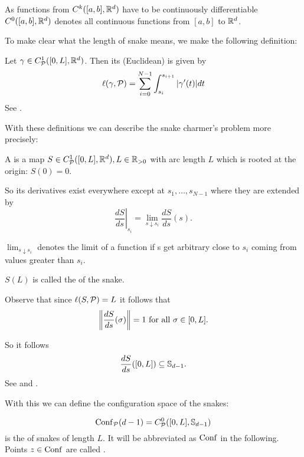 \begin{remark}
    As functions from $C^{k}({[a,b]}, \mathbb{R}^d)$ have to be continuously differentiable
    $C^{0}({[a,b]}, \mathbb{R}^d)$ denotes all continuous functions from $[a,b]$ to $\mathbb{R}^d$.
\end{remark}

To make clear what the length of snake means, we make the following definition:
\begin{definition}
    Let $\gamma \in C^{1}_{\mathcal{P}}({[0,L]}, {\mathbb{R}^d})$. Then its (Euclidean) 
    is given by
    \[
        \ell({\gamma}, \mathcal{P})
        = \sum_{i=0}^{N-1}\int_{s_i}^{s_{i+1}} |\gamma'(t)| dt
    \]
    See \cite[p. 31]{Ratcliff}.
\end{definition}

With these definitions we can describe the snake charmer's problem more precisely:
\begin{definition}
    A  is a map $S \in C^{1}_{\mathcal{P}}({[0,L]}, {\mathbb{R}^d}), L \in \mathbb{R}_{>0}$
    with arc length $L$ which is rooted at the origin: $S(0) = 0$.
    
    So its derivatives exist everywhere except at $s_1, \ldots, s_{N-1}$ where
    they are extended by
    \[
        \left.\frac{dS}{ds}\right|_{s_i} = \lim_{s \downarrow s_i}\frac{dS}{ds}(s).
    \]
    
    $\lim_{s \downarrow s_i}$ denotes the limit of a function if s get arbitrary
    close to $s_i$ coming from values greater than $s_i$.

    $S(L)$ is called the  of the snake.
\end{definition}

\begin{lemma}
    Observe that since $\ell({S}, \mathcal{P}) = L$ it follows that
    \[
        \left\Vert{\frac{dS}{ds}(\sigma)}\right\Vert = 1 \text{ for all } \sigma \in [0,L] .
    \]
    
    So it follows
    \[  \frac{dS}{ds}([0,L]) \subseteq \mathbb{S}_{d-1} . \]
    See \cite[p. 35-36]{Tarapov} and \cite{Rodriguez07}.
\end{lemma}

With this we can define the configuration space of the snakes:
\begin{definition}
    \[\operatorname{Conf}_{\mathcal{P}}(d-1) = C^{0}_{\mathcal{P}}({[0,L]}, {\mathbb{S}_{d-1}}) \]
    is the  of snakes of length $L$.
    It will be abbreviated as $\operatorname{Conf}$ in the following.
    Points $z \in \operatorname{Conf}$ are called .
\end{definition}

